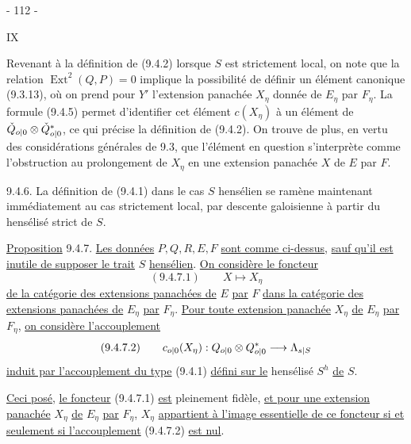 \begin{center}- 112 -\end{center}\hfill IX

Revenant à la définition de (9.4.2) lorsque $S$ est strictement local, on note que la relation $\operatorname{Ext}^2(Q,P)=0$ implique la possibilité de définir un élément canonique (9.3.13), où on prend pour $Y'$ l'extension panachée $X_\eta$ donnée de $E_\eta$ par $F_\eta$. La formule (9.4.5) permet d'identifier cet élément $c(X_\eta)$ à un élément de $\check Q_{{o|0}}\otimes\check Q_{{o|0}}^*$, ce qui précise la définition de (9.4.2). On trouve de plus, en vertu des considérations générales de 9.3, que l'élément en question s'interprète comme l'obstruction au prolongement de $X_\eta$ en une extension panachée $X$ de $E$ par $F$.

9.4.6. La définition de (9.4.1) dans le cas $S$ hensélien se ramène maintenant immédiatement au cas strictement local, par descente galoisienne à partir du hensélisé strict de $S$.

\uline{Proposition} 9.4.7. \uline{Les données} $P,Q,R,E,F$ \uline{sont comme ci-dessus}, \uline{sauf qu'il est inutile de supposer le trait} $S$ \uline{hensélien}. \uline{On considère le foncteur}
\[
 (9.4.7.1)\qquad X\longmapsto X_\eta
\]
\uline{de la catégorie des extensions panachées de} $E$ \uline{par} $F$ \uline{dans la catégorie des extensions panachées de} $E_\eta$ \uline{par} $F_\eta$. \uline{Pour toute extension panachée} $X_\eta$ \uline{de} $E_\eta$ \uline{par} $F_\eta$, \uline{on considère l'accouplement}
\[
 (9.4.7.2)\qquad c_{{o|0}}(X_\eta):Q_{{o|0}}\otimes Q_{{o|0}}^*\longrightarrow\Lambda_{{s|S}}
\]
\uline{induit par l'accouplement du type} (9.4.1) \uline{défini sur le} hensélisé $S^h$ \uline{de} $S$.

\uline{Ceci posé}, \uline{le foncteur} (9.4.7.1) \uline{est} pleinement fidèle, \uline{et pour une extension panachée} $X_\eta$ \uline{de} $E_\eta$ \uline{par} $F_\eta$, $X_\eta$ \uline{appartient à l'image essentielle de ce foncteur si et seulement si l'accouplement} (9.4.7.2) \uline{est nul}.
